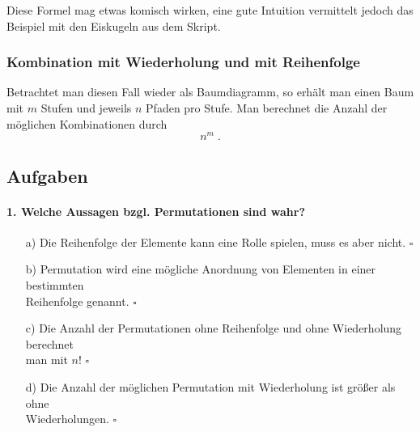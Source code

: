 \documentclass[a4paper]{article}
\newcommand\dangersign{%
 \makebox[1.8em][c]{%
 \makebox[0pt][c]{\raisebox{.15em}{\small!}}%
 \makebox[0pt][c]{\color{red}\Large$\triangle$}}}%
\begin{document}
\noindent \dangersign Diese Formel mag etwas komisch wirken, eine gute Intuition vermittelt jedoch das Beispiel mit den Eiskugeln aus dem Skript.

\subsubsection{Kombination mit Wiederholung und mit Reihenfolge}
Betrachtet man diesen Fall wieder als Baumdiagramm, so erhält man einen Baum mit $m$ Stufen und jeweils $n$ Pfaden pro Stufe. Man berechnet die Anzahl der möglichen Kombinationen durch $$n^m\;.$$

\clearpage

\subsection{Aufgaben}
\paragraph{1. Welche Aussagen bzgl. Permutationen sind wahr?}
\begin{itemize}
    \item[a)] Die Reihenfolge der Elemente kann eine Rolle spielen, muss es aber nicht. \hfill $\square$
    \item[b)] Permutation wird eine mögliche Anordnung von Elementen in einer bestimmten\\ Reihenfolge genannt.  \hfill $\square$
    \item[c)] Die Anzahl der Permutationen ohne Reihenfolge und ohne Wiederholung berechnet\\ man mit $n!$ \hfill $\square$
    \item[d)] Die Anzahl der möglichen Permutation mit Wiederholung ist größer als ohne\\ Wiederholungen. \hfill $\square$
\end{itemize}
\end{document}
